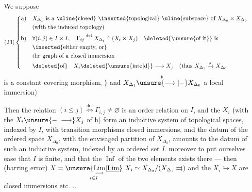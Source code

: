 We suppose
\[
(23)\left\{\begin{aligned}
\text{a)}\quad &X_{\Delta_1}\text{ is a \uline{closed} \inserted{topological} \uline{subspace} of }X_{\Delta_0}\times X_{\Delta_0}\\
&\text{(with the induced topology)}\\
\text{b)}\quad &\forall(i,j)\in I\times I,\quad\Gamma_{ij}\overset{\mathrm{def}}{=}X_{\Delta_1}\cap(X_i\times X_j)\quad\text{\deleted{\unsure{of it}} is}\\
&\text{\inserted{either empty, or}}\\
&\text{the graph of a closed immersion}\\
&\deleted{\text{of}}\quad X_i\deleted{\text{\unsure{into|d}}}\longrightarrow X_j
\quad\text{(thus }X_{\Delta_1}\xrightarrow{\sigma}X_{\Delta_0}
\end{aligned}\right.
\]
is a constant  covering morphism, $\}$
 and
$X_{\Delta_1}\overset{b}{\unsure{\longrightarrow|-}}X_{\Delta_0}$ a local immersion)

Then the relation $(i\leq j)\overset{\mathrm{def}}{\Longleftrightarrow}\Gamma_{i,j}\ne\varnothing$ is an
order relation on $I$,  and the $X_i$
(with the $X_i\unsure{-|\longrightarrow}X_j$ of b) form an
inductive system of topological spaces,
indexed by $I$, with transition
morphisms closed immersions, and
the datum of the ordered  space $X_{\Delta_0}$,
 with the envisaged partition of $X_{\Delta_0}$,
amounts to the datum of such an inductive
system, indexed by an ordered set $I$.
 moreover to put ourselves
 ease that $I$ is finite, and that the
$\operatorname{Inf}$ of the two elements exists there --- then
(barring error) $X=\underset{i\in I}{\unsure{\underset{\longrightarrow}{\mathrm{Lim}}|\underline{\mathrm{Lim}}}}\ X_i\simeq
X_{\Delta_0}/(X_{\Delta_1}\rightrightarrows)$
and the $X_i\hookrightarrow X$ are closed immersions
etc. ...

